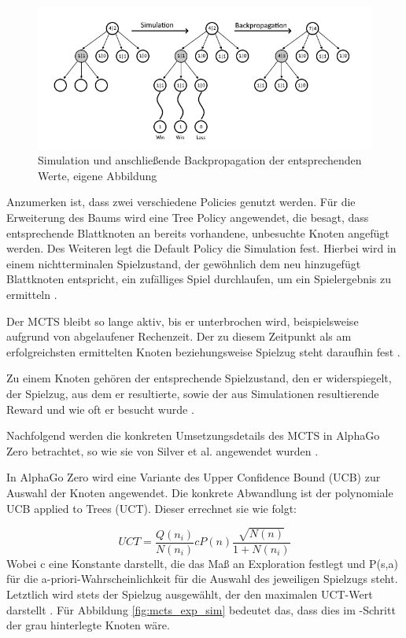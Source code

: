 \documentclass[12pt,a4paper]{article}
\begin{document}
\begin{figure}
\centering
\includegraphics[width=1.0\textwidth]{pics/Backpropagation.png}
\caption{Simulation und anschließende Backpropagation der entsprechenden Werte, eigene Abbildung}
	\label{fig:mcts_backpropagation}
\end{figure}

Anzumerken ist, dass zwei verschiedene Policies genutzt werden. Für die Erweiterung des Baums wird eine Tree Policy angewendet, die besagt, dass entsprechende Blattknoten an bereits vorhandene, unbesuchte Knoten angefügt werden. Des Weiteren legt die Default Policy die Simulation fest. Hierbei wird in einem nichtterminalen Spielzustand, der gewöhnlich dem neu hinzugefügt Blattknoten entspricht, ein zufälliges Spiel durchlaufen, um ein Spielergebnis zu ermitteln \cite{Browne2012}. 

Der MCTS bleibt so lange aktiv, bis er unterbrochen wird, beispielsweise aufgrund von abgelaufener Rechenzeit. Der zu diesem Zeitpunkt als am erfolgreichsten ermittelten Knoten beziehungsweise Spielzug steht daraufhin fest \cite{Browne2012}.

Zu einem Knoten gehören der entsprechende Spielzustand, den er widerspiegelt, der Spielzug, aus dem er resultierte, sowie der aus Simulationen resultierende Reward und wie oft er besucht wurde \cite{Browne2012}.

Nachfolgend werden die konkreten Umsetzungsdetails des MCTS in AlphaGo Zero betrachtet, so wie sie von Silver et al. angewendet wurden \cite{Silver2017}.

In AlphaGo Zero wird eine Variante des Upper Confidence Bound (UCB) zur Auswahl der Knoten angewendet. Die konkrete Abwandlung ist der polynomiale UCB applied to Trees (UCT). Dieser errechnet sie wie folgt:

\begin{equation}
UCT = \frac{Q(n_i)}{N(n_i)} cP(n) \frac{\sqrt{N(n)}}{1+N(n_i)}
\end{equation} 
Wobei c eine Konstante darstellt, die das Maß an Exploration festlegt und P(s,a) für die a-priori-Wahrscheinlichkeit für die Auswahl des jeweiligen Spielzugs steht. Letztlich wird stets der Spielzug ausgewählt, der den maximalen UCT-Wert darstellt \cite{Silver2017}.
Für Abbildung \ref{fig:mcts_exp_sim} bedeutet das, dass dies im \grqq{}-Schritt der grau hinterlegte Knoten wäre.
\end{document}
